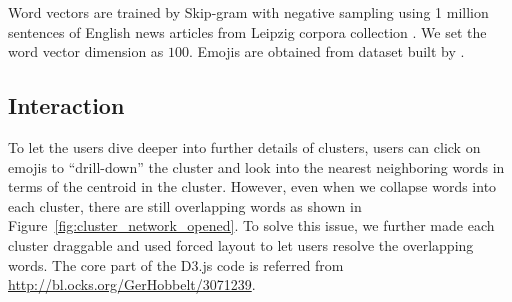 Word vectors are trained by Skip-gram with negative sampling \cite{NIPS2013_5021} using 1 million sentences of English news articles from Leipzig corpora collection \cite{Goldhahn12buildinglarge}. We set the word vector dimension as $100$. 
Emojis are obtained from dataset built by \cite{eisner-EtAl:2016:SocialNLP}. 


\subsection{Interaction}
To let the users dive deeper into further details of clusters, users can click on emojis to ``drill-down'' \cite{Elmqvist:2010:HAI:1749404.1749525} the cluster and look into the nearest neighboring words in terms of the centroid in the cluster.
However, even when we collapse words into each cluster, there are still overlapping words as shown in Figure~\ref{fig:cluster_network_opened}. 
To solve this issue, we further made each cluster draggable and used forced layout to let users resolve the overlapping words. 
The core part of the D3.js code is referred from \url{http://bl.ocks.org/GerHobbelt/3071239}.

